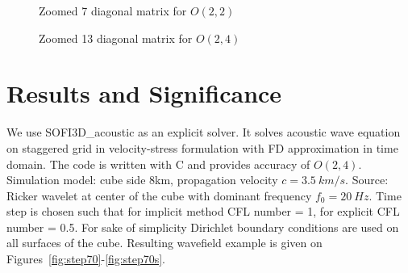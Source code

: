 \documentclass[12pt,a4paper]{report}
\begin{document}
\begin{figure}[h!]
\begin{minipage}[h!]{0.49\textwidth}
  	\caption{Zoomed 7 diagonal matrix for $O(2,2)$}
  	\label{fig:m22}
\end{minipage}
\hfill
\begin{minipage}[h!]{0.49\textwidth}
  	\caption{Zoomed 13 diagonal matrix for $O(2,4)$}
  	\label{fig:m24}
\end{minipage}
\end{figure}

\section*{Results and Significance}

We use SOFI3D\_acoustic as an explicit solver. It solves acoustic wave equation on staggered grid in velocity-stress formulation with FD approximation in time domain. The code is written with C and provides accuracy of $O(2,4)$. Simulation model: cube side 8km, propagation velocity $c=3.5\ km/s$. Source: Ricker wavelet at center of the cube with dominant frequency $f_0=20\ Hz$. Time step is chosen such that for implicit method CFL number = 1, for explicit CFL number = 0.5. For sake of simplicity Dirichlet boundary conditions are used on all surfaces of the cube. Resulting wavefield example is given on Figures~\ref{fig:step70}-\ref{fig:step70s}.
\end{document}
